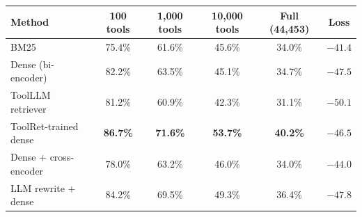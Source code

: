 \begin{tabular}{lccccc}
\toprule
\textbf{Method} & \textbf{100 tools} & \textbf{1,000 tools} & \textbf{10,000 tools} & \textbf{Full (44,453)} & \textbf{Loss} \\
\midrule
BM25 & 75.4\% & 61.6\% & 45.6\% & 34.0\% & $-41.4$ \\
Dense (bi-encoder) & 82.2\% & 63.5\% & 45.1\% & 34.7\% & $-47.5$ \\
ToolLLM retriever & 81.2\% & 60.9\% & 42.3\% & 31.1\% & $-50.1$ \\
ToolRet-trained dense & \textbf{86.7\%} & \textbf{71.6\%} & \textbf{53.7\%} & \textbf{40.2\%} & $-46.5$ \\
Dense + cross-encoder & 78.0\% & 63.2\% & 46.0\% & 34.0\% & $-44.0$ \\
LLM rewrite + dense & 84.2\% & 69.5\% & 49.3\% & 36.4\% & $-47.8$ \\
\bottomrule
\end{tabular}
